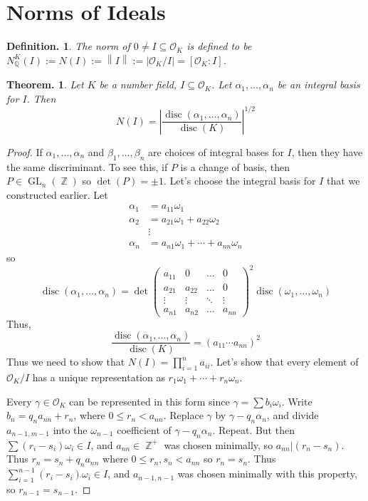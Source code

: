 \documentclass[11pt, a4paper]{memoir}
\DeclareMathOperator{\Q}{{\mathbb{Q}}}
\DeclareMathOperator{\Z}{{\mathbb{Z}}}
\newcommand{\norm}[1]{\ensuremath{\left\lVert#1\right\rVert}}
\theoremstyle{change}
\newtheorem{theorem}{Theorem.}[section]
\theoremstyle{plain}
\theoremstyle{nonumberplain}
\newtheorem{definition}{Definition.}
\newtheorem{proof}{Proof}
\DeclareMathOperator{\disc}{disc}
\DeclareMathOperator{\GL}{GL}
\numberwithin{equation}{section}
\begin{document}
\section{Norms of Ideals}
\begin{definition}
    The norm of $0\neq I\subseteq\mathcal{O}_K$ is defined to be $N_{\Q}^K(I):=N(I):=\norm{I}:=|\mathcal{O}_K/I|=[\mathcal{O}_K:I]$.
\end{definition}
\begin{theorem}
    Let $K$ be a number field, $I\subseteq\mathcal{O}_K$.
    Let $\alpha_1,\ldots,\alpha_n$ be an integral basis for $I$.
    Then
    \begin{equation*}
        N(I)=\left\lvert\frac{\disc(\alpha_1,\ldots,\alpha_n)}{\disc(K)}\right\rvert^{1/2}
    \end{equation*}
\end{theorem}
\begin{proof}
    If $\alpha_1,\ldots,\alpha_n$ and $\beta_1,\ldots,\beta_n$ are choices of integral bases for $I$, then they have the same discriminant.
    To see this, if $P$ is a change of basis, then $P\in\GL_n(\Z)$ so $\det(P)=\pm 1$.
    Let's choose the integral basis for $I$ that we constructed earlier.
    Let
    \begin{align*}
        \alpha_1 &= a_{11}\omega_1\\
        \alpha_2 &= a_{21}\omega_1+a_{22}\omega_2\\
                 &\vdots\\
        \alpha_n &= a_{n1}\omega_1+\cdots+a_{nn}\omega_n
    \end{align*}
    so
    \begin{equation*}
        \disc(\alpha_1,\ldots,\alpha_n) = \det
        \begin{pmatrix}a_{11}&0&\hdots&0\\a_{21}&a_{22}&\hdots&0\\\vdots&\vdots&\ddots&\vdots\\a_{n1}&a_{n2}&\hdots&a_{nn}\end{pmatrix}^2\disc(\omega_1,\ldots,\omega_n)
    \end{equation*}
    Thus,
    \begin{equation*}
        \frac{\disc(\alpha_1,\ldots,\alpha_n)}{\disc(K)}=(a_{11}\cdots a_{nn})^2
    \end{equation*}
    Thus we need to show that $N(I)=\prod_{i=1}^n a_{ii}$.
    Let's show that every element of $\mathcal{O}_K/I$ has a unique representation as $r_1\omega_1+\cdots+r_n\omega_n$.

    Every $\gamma\in\mathcal{O}_K$ can be represented in this form since $\gamma=\sum b_i\omega_i$.
    Write $b_n=q_na_{nn}+r_n$, where $0\leq r_n<a_{nn}$.
    Replace $\gamma$ by $\gamma-q_n\alpha_n$, and divide $a_{n-1,m-1}$ into the $\omega_{n-1}$ coefficient of $\gamma-q_n\alpha_n$.
    Repeat.
    But then $\sum(r_i-s_i)\omega_i\in I$, and $a_{nn}\in\Z^+$ was chosen minimally, so $a_{nn}|(r_n-s_n)$.
    Thus $r_n=s_n+q_na_{nn}$ where $0\leq r_n,s_n<a_{nn}$ so $r_n=s_n$.
    Thus $\sum_{i=1}^{n-1}(r_i-s_i)\omega_i\in I$, and $a_{n-1,n-1}$ was chosen minimally with this property, so $r_{n-1}=s_{n-1}$.
\end{proof}
\end{document}
